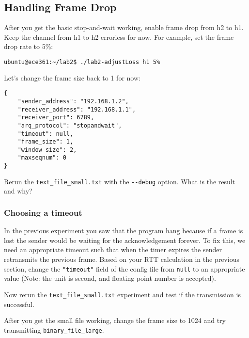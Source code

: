 \documentclass[11pt]{article}
\begin{document}
\subsection{Handling Frame Drop}
After you get the basic stop-and-wait working, enable frame drop from h2 to h1. Keep the channel from h1 to h2 errorless for now. For example, set the frame drop rate to 5\%:
\begin{lstlisting}[style=ece361-shell-base]
ubuntu@ece361:~/lab2$ ./lab2-adjustLoss h1 5%
\end{lstlisting}
Let's change the frame size back to 1 for now:

\begin{minipage}{\linewidth}
\begin{lstlisting}[style=ece361-shell-base, caption={Configuration For Large File}]
{
    "sender_address": "192.168.1.2",
    "receiver_address": "192.168.1.1",
    "receiver_port": 6789,
    "arq_protocol": "stopandwait",
    "timeout": null,
    "frame_size": 1,
    "window_size": 2,
    "maxseqnum": 0
}
\end{lstlisting}
\end{minipage}
Rerun the \texttt{text\_file\_small.txt} with the \texttt{-{}-debug} option. What is the result and why?

\subsubsection {Choosing a timeout}
In the previous experiment you saw that the program hang because if a frame is lost the sender would be waiting for the acknowledgement forever.
To fix this, we need an appropriate timeout such that when the timer expires the sender retransmits the previous frame.
Based on your RTT calculation in the previous section, change the \texttt{"timeout"} field of the config file from \texttt{null} to an appropriate value (Note: the unit is second, and floating point number is accepted).


\noindent Now rerun the \texttt{text\_file\_small.txt} experiment and test if the transmission is successful.

\noindent After you get the small file working, change the frame size to 1024 and try transmitting \texttt{binary\_file\_large}.

\end{document}
